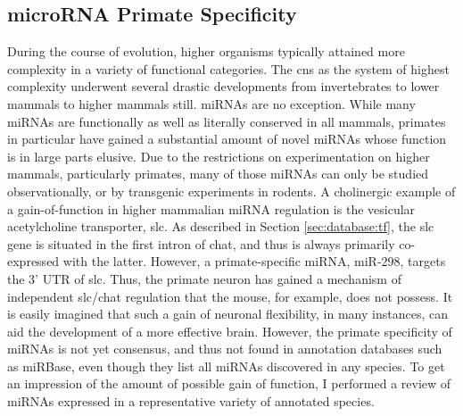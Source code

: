 \subsection{microRNA Primate Specificity}
During the course of evolution, higher organisms typically attained more complexity in a variety of functional categories. The \ac{cns} as the system of highest complexity underwent several drastic developments from invertebrates to lower mammals to higher mammals still. miRNAs are no exception. While many miRNAs are functionally as well as literally conserved in all mammals, primates in particular have gained a substantial amount of novel miRNAs whose function is in large parts elusive. Due to the restrictions on experimentation on higher mammals, particularly primates, many of those miRNAs can only be studied observationally, or by transgenic experiments in rodents. A cholinergic example of a gain-of-function in higher mammalian miRNA regulation is the vesicular acetylcholine transporter, \ac{slc}. As described in Section \ref{sec:database:tf}, the \ac{slc} gene is situated in the first intron of \ac{chat}, and thus is always primarily co-expressed with the latter. However, a primate-specific miRNA, miR-298, targets the 3' UTR of \ac{slc}\cite{Soreq2015}. Thus, the primate neuron has gained a mechanism of independent \ac{slc}/\ac{chat} regulation that the mouse, for example, does not possess. It is easily imagined that such a gain of neuronal flexibility, in many instances, can aid the development of a more effective brain. However, the primate specificity of miRNAs is not yet consensus, and thus not found in annotation databases such as miRBase, even though they list all miRNAs discovered in any species. To get an impression of the amount of possible gain of function, I performed a review of miRNAs expressed in a representative variety of annotated species.

